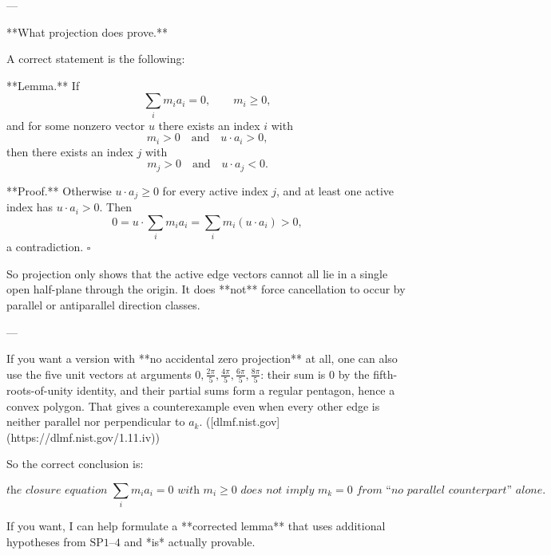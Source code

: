 ---

**What projection does prove.**

A correct statement is the following:

**Lemma.** If
\[
\sum_i m_i a_i=0,\qquad m_i\ge 0,
\]
and for some nonzero vector \(u\) there exists an index \(i\) with
\[
m_i>0
\quad\text{and}\quad
u\cdot a_i>0,
\]
then there exists an index \(j\) with
\[
m_j>0
\quad\text{and}\quad
u\cdot a_j<0.
\]

**Proof.** Otherwise \(u\cdot a_j\ge 0\) for every active index \(j\), and at least one active index has \(u\cdot a_i>0\). Then
\[
0
=
u\cdot \sum_i m_i a_i
=
\sum_i m_i (u\cdot a_i)
>
0,
\]
a contradiction. \(\square\)

So projection only shows that the active edge vectors cannot all lie in a single open half-plane through the origin. It does **not** force cancellation to occur by parallel or antiparallel direction classes.

---

If you want a version with **no accidental zero projection** at all, one can also use the five unit vectors at arguments \(0,\frac{2\pi}{5},\frac{4\pi}{5},\frac{6\pi}{5},\frac{8\pi}{5}\): their sum is \(0\) by the fifth-roots-of-unity identity, and their partial sums form a regular pentagon, hence a convex polygon. That gives a counterexample even when every other edge is neither parallel nor perpendicular to \(a_k\). ([dlmf.nist.gov](https://dlmf.nist.gov/1.11.iv))

So the correct conclusion is:

\[
\textit{the closure equation } \sum_i m_i a_i=0 \textit{ with } m_i\ge 0
\textit{ does not imply } m_k=0 \textit{ from “no parallel counterpart” alone.}
\]

If you want, I can help formulate a **corrected lemma** that uses additional hypotheses from \( \mathrm{SP1\text{--}4} \) and *is* actually provable.